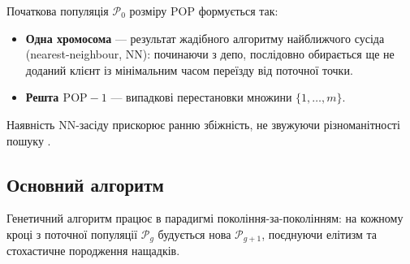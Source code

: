 \documentclass[14pt,a4paper]{extarticle}
\theoremstyle{definition}
\theoremstyle{plain}
\begin{document}
Початкова популяція $\mathcal{P}_0$ розміру $\mathrm{POP}$ формується так:
\begin{itemize}[leftmargin=2em]
    \item \textbf{Одна хромосома} --- результат жадібного алгоритму найближчого сусіда (nearest-neighbour, NN): починаючи з депо, послідовно обирається ще не доданий клієнт із мінімальним часом переїзду від поточної точки.
    \item \textbf{Решта $\mathrm{POP} - 1$} --- випадкові перестановки множини $\{1, \ldots, m\}$.
\end{itemize}
Наявність NN-засіду прискорює ранню збіжність, не звужуючи різноманітності пошуку \cite{prins2004}.

\subsection{Основний алгоритм}

Генетичний алгоритм працює в парадигмі покоління-за-поколінням: на кожному кроці з поточної популяції $\mathcal{P}_g$ будується нова $\mathcal{P}_{g+1}$, поєднуючи елітизм та стохастичне породження нащадків.
\end{document}
